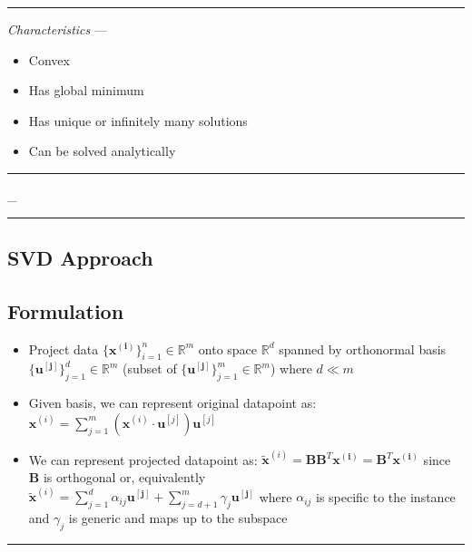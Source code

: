 {\color{lightgray}\hrule height 0.001mm}

\emph{Characteristics} --- 
\begin{itemize}
    \item Convex 
    \item Has global minimum
    \item Has unique or infinitely many solutions
    \item Can be solved analytically
\end{itemize}

{\color{black}\hrule height 0.001mm}
_
{\color{black}\hrule height 0.001mm}

\subsection*{SVD Approach}
\subsection*{Formulation}
\begin{itemize}
    \item Project data $\{\boldsymbol{x^{(i)}}\}_{i=1}^n \in \mathbb{R}^m$ onto space $\mathbb{R}^d$ spanned by orthonormal basis $\{\boldsymbol{u^{[j]}}\}_{j=1}^d \in \mathbb{R}^m$ (subset of $\{\boldsymbol{u^{[j]}}\}_{j=1}^m \in \mathbb{R}^m$) where $d \ll m$
    \item Given basis, we can represent original datapoint as: $\boldsymbol{x}^{(i)} = \sum_{j=1}^m (\boldsymbol{x}^{(i)} \cdot \boldsymbol{u}^{[j]})\boldsymbol{u}^{[j]}$
    \item We can represent projected datapoint as: $\tilde{\boldsymbol{x}}^{(i)} = \boldsymbol{B}\boldsymbol{B}^T \boldsymbol{x^{(i)}} = \boldsymbol{B}^T \boldsymbol{x^{(i)}}$ since $\boldsymbol{B}$ is orthogonal
    or, equivalently\\
    $\tilde{\boldsymbol{x}}^{(i)} = \sum_{j=1}^d \alpha_{ij} \boldsymbol{u^{[j]}} + \sum_{j=d+1}^m \gamma_j \boldsymbol{u^{[j]}}$ where $\alpha_{ij}$ is specific to the instance and $\gamma_j$ is generic and maps up to the subspace
\end{itemize}

{\color{black}\hrule height 0.001mm}

